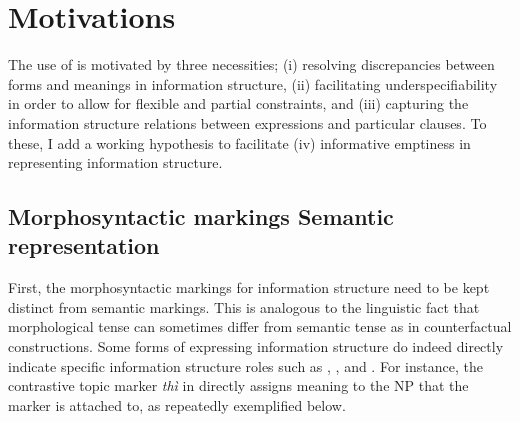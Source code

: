 \section{Motivations}
\label{9:sec:motivations}

The use of  is motivated by three necessities; (i)
resolving discrepancies between forms and meanings in information
structure, (ii) facilitating underspecifiability in order to allow for
flexible and partial constraints, and (iii) capturing the 
information structure relations between expressions and particular
clauses.  To these, I add a working hypothesis to facilitate (iv)
informative emptiness in representing information structure.



\subsection{Morphosyntactic markings \vs Semantic representation}
\label{9:ssec:ms-vs-sr}

First, the morphosyntactic markings for information structure need to
be kept distinct from semantic markings. This is analogous to the
linguistic fact that morphological tense can sometimes differ from
semantic tense as in counterfactual constructions. Some forms of
expressing information structure do indeed directly indicate specific
information structure roles such as , , and
. For instance, the contrastive topic marker
\textit{th{\`i}} in  directly assigns  meaning to the NP that the marker is attached to, as
repeatedly exemplified below.


